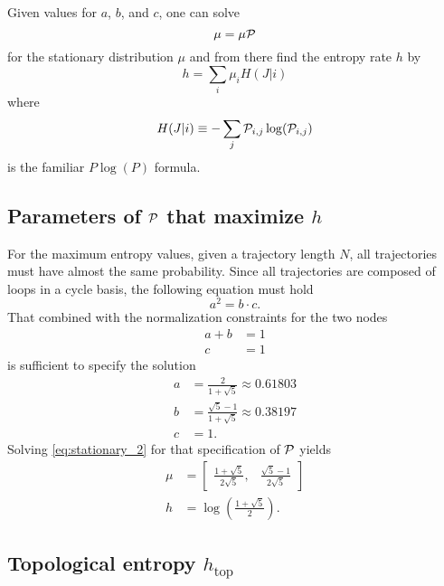 \documentclass[12pt]{article} \usepackage{amsmath,amsfonts}
\newcommand{\htop}{{h_{\text{top}}}}
\newcommand{\T}{{\cal P}}
\begin{document}
Given values for $a$, $b$, and $c$, one can solve
\begin{equation}
  \label{eq:stationary_2}
  \mu = \mu \T
\end{equation}
for the stationary distribution $\mu$ and from there find the entropy
rate $h$ by
\begin{equation}
  \label{eq:rate}
  h = \sum_i \mu_i H(J|i)
\end{equation}
where
\begin{equation*}
  H(J|i) \equiv -\sum_j \T_{i,j} \log (\T_{i,j})
\end{equation*}
is the familiar $P\log(P)$ formula.

\subsection{Parameters of $\T$ that maximize $h$}
\label{sec:max}

For the maximum entropy values, given a trajectory length $N$, all
trajectories must have almost the same probability.  Since all
trajectories are composed of loops in a cycle basis, the following
equation must hold
\begin{equation}
  \label{eq:excycle}
  a^2 = b\cdot c.
\end{equation}
That combined with the normalization constraints for the two nodes
\begin{align*}
  a + b &= 1 \\
  c &= 1
\end{align*}
is sufficient to specify the solution
\begin{align*}
  a &= \frac{2}{1+\sqrt{5}} \approx          0.61803\\
  b &= \frac{\sqrt{5}-1}{1+\sqrt{5}} \approx 0.38197\\
  c &= 1.
\end{align*}
Solving \eqref{eq:stationary_2} for that specification of $\T$ yields
\begin{align*}
  \mu &=  \begin{bmatrix} \frac{1+\sqrt{5}}{2\sqrt{5}}, &
    \frac{\sqrt{5}-1}{2\sqrt{5}} \end{bmatrix} \\
  h &= \log\left(\frac{1+\sqrt{5}}{2}\right).
\end{align*}


\subsection{Topological entropy $\htop$}
\label{sec:htop}
\end{document}
